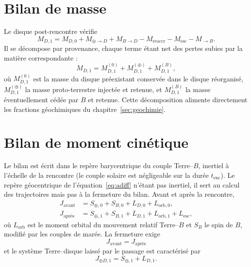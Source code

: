 \documentclass[11pt,a4paper,openany]{report}
\begin{document}
\section{Bilan de masse}

Le disque post-rencontre vérifie
\begin{equation}
M_{D,1}=M_{D,0}+M_{\oplus\to D}+M_{B\to D}-M_{\mathrm{reaccr}}-M_{\mathrm{esc}}-M_{\to B}.
\label{eq:bilanM1}
\end{equation}
Il se décompose par provenance, chaque terme étant net des pertes subies par la matière
correspondante :
\begin{equation}
M_{D,1}=M_{D,1}^{(0)}+M_{D,1}^{(\oplus)}+M_{D,1}^{(B)},
\label{eq:provenance}
\end{equation}
où $M_{D,1}^{(0)}$ est la masse du disque préexistant conservée dans le disque réorganisé,
$M_{D,1}^{(\oplus)}$ la masse proto-terrestre injectée et retenue, et $M_{D,1}^{(B)}$ la masse
éventuellement cédée par $B$ et retenue. Cette décomposition alimente directement les fractions
géochimiques du chapitre~\ref{sec:geochimie}.

\section{Bilan de moment cinétique}

Le bilan est écrit dans le repère barycentrique du couple Terre--$B$, inertiel à l'échelle de la
rencontre (le couple solaire est négligeable sur la durée $t_{\mathrm{enc}}$). Le repère
géocentrique de l'équation~\eqref{eq:adiff} n'étant pas inertiel, il sert au calcul des
trajectoires mais pas à la fermeture du bilan. Avant et après la rencontre,
\begin{align}
J_{\mathrm{avant}}&=S_{\oplus,0}+S_{B,0}+L_{D,0}+L_{\mathrm{orb},0},
\label{eq:Javant}\\
J_{\text{après}}&=S_{\oplus,1}+S_{B,1}+L_{D,1}+L_{\mathrm{orb},1}+L_{\mathrm{esc}},
\label{eq:Japres}
\end{align}
où $L_{\mathrm{orb}}$ est le moment orbital du mouvement relatif Terre--$B$ et $S_B$ le spin de $B$,
modifié par les couples de marée. La fermeture exige
\begin{equation}
\boxed{\;J_{\mathrm{avant}}=J_{\text{après}}\;}
\label{eq:fermeture}
\end{equation}
et le système Terre--disque laissé par le passage est caractérisé par
\begin{equation}
J_{\oplus D,1}=S_{\oplus,1}+L_{D,1}.
\label{eq:J1}
\end{equation}
\end{document}
